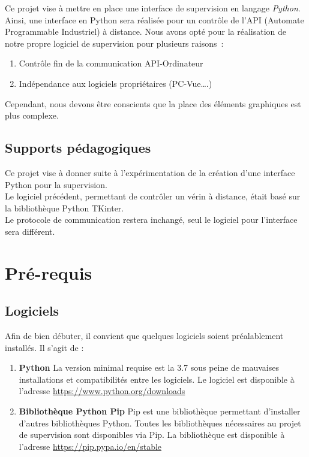 {Ce projet vise à mettre en place une interface de supervision en langage \emph{Python}.\newline
Ainsi, une interface en Python sera réalisée pour un contrôle de l’API (Automate Programmable Industriel) à distance. \newline
Nous avons opté pour la réalisation de notre propre logiciel de supervision pour plusieurs raisons : \newline

\begin{enumerate}
\item Contrôle fin de la communication API-Ordinateur
\item Indépendance aux logiciels propriétaires (PC-Vue….) \newline
\end{enumerate} 

Cependant, nous devons être conscients que la place des éléments graphiques est plus complexe.

\section{Supports pédagogiques}

Ce projet vise à donner suite à l'expérimentation de la création d'une interface Python pour la supervision. \\
Le logiciel précédent, permettant de contrôler un vérin à distance, était basé sur la bibliothèque Python TKinter. \\
Le protocole de communication restera inchangé, seul le logiciel pour l'interface sera différent.

\chapter{Pré-requis}
\section{Logiciels}

Afin de bien débuter, il convient que quelques logiciels soient préalablement installés.
Il s'agit de : \newline


\begin{enumerate}
\item \textbf{Python} \newline
La version minimal requise est la 3.7 sous peine de mauvaises installations et compatibilités entre les logiciels. \newline
Le logiciel est disponible à l'adresse \url{https://www.python.org/downloads} \newline
\item \textbf{Bibliothèque Python Pip} \newline 
Pip est une bibliothèque permettant d'installer d'autres bibliothèques Python. Toutes les bibliothèques nécessaires au projet de supervision sont disponibles via Pip. \newline
La bibliothèque est disponible à l'adresse \url{https://pip.pypa.io/en/stable} \newline


\end{enumerate}}
